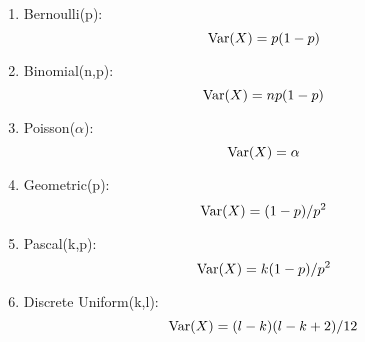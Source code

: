 \begin{enumerate}
{\begin{enumerate}
{\begin{enumerate}
                    \item Bernoulli(p): $$\mathop{\mathrm{Var}}\nolimits(X)=p(1-p)$$
                    \item Binomial(n,p): $$\mathop{\mathrm{Var}}\nolimits(X)=np(1-p)$$
                    \item Poisson($\alpha$): $$\mathop{\mathrm{Var}}\nolimits(X)=\alpha$$
                    \item Geometric(p): $$\mathop{\mathrm{Var}}\nolimits(X)=(1-p)/p^2$$
                    \item Pascal(k,p): $$\mathop{\mathrm{Var}}\nolimits(X)=k(1-p)/p^2$$
                    \item Discrete Uniform(k,l): $$\mathop{\mathrm{Var}}\nolimits(X)=(l-k)(l-k+2)/12$$
                \end{enumerate}
            }
        \end{enumerate}
    }
\end{enumerate}